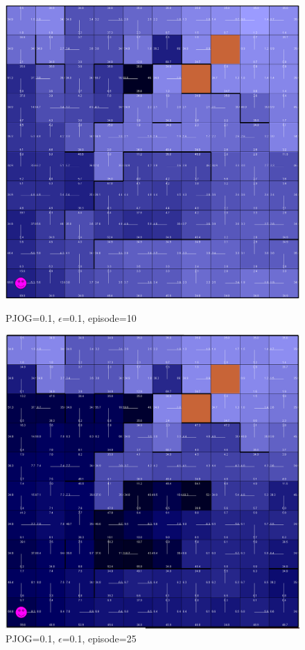 \documentclass[11pt]{article}
\begin{document}
\begin{figure}[!htb]
   \begin{minipage}{0.4\textwidth}
     \centering
     \includegraphics[width=1.2\linewidth]{../figures/q2_1_10.png}
     \caption{PJOG=0.1, $\epsilon$=0.1, episode=10}\label{Fig:q2_1_10}
   \end{minipage}\hfill
   \begin{minipage}{0.4\textwidth}
     \centering
     \includegraphics[width=1.2\linewidth]{../figures/q2_1_25.png}
     \caption{PJOG=0.1, $\epsilon$=0.1, episode=25}\label{Fig:q2_1_25}
   \end{minipage}
\end{figure}
\end{document}
